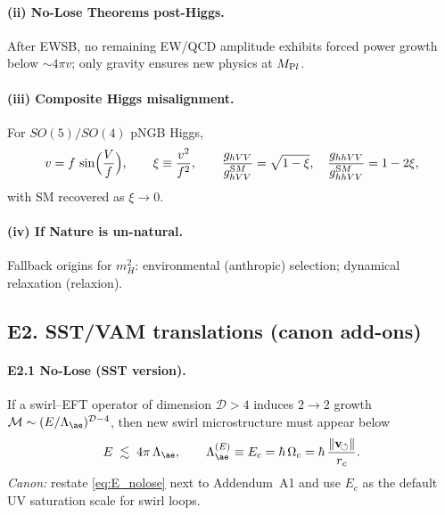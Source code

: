 \documentclass[11pt]{article}
\begin{document}
          \paragraph{(ii) No-Lose Theorems post-Higgs.}
              After EWSB, no remaining EW/QCD amplitude exhibits forced power growth below $\sim 4\pi v$; only gravity ensures new physics at $M_{\textrm Pl}$.

          \paragraph{(iii) Composite Higgs misalignment.}
              For $SO(5)/SO(4)$ pNGB Higgs,
              \begin{equation}\label{eq:E_pNGB}
          v=f\,\sin\!\Big(\frac{V}{f}\Big),\qquad \xi\equiv\frac{v^2}{f^2},
          \qquad
          \frac{g_{hVV}}{g_{hVV}^{\textrm SM}}=\sqrt{1-\xi},\quad
          \frac{g_{hhVV}}{g_{hhVV}^{\textrm SM}}=1-2\xi,
              \end{equation}
              with SM recovered as $\xi\to0$.

          \paragraph{(iv) If Nature is un-natural.}
              Fallback origins for $m_H^2$: environmental (anthropic) selection; dynamical relaxation (relaxion).

  \subsection*{E2. SST/VAM translations (canon add-ons)}
      \paragraph{E2.1 No-Lose (SST version).}
          If a swirl–EFT operator of dimension $\mathcal D>4$ induces $2\!\to\!2$ growth
          $\mathcal M\sim (E/\Lambda_{\ae})^{\mathcal D-4}$, then new swirl microstructure must appear below
          \begin{equation}\label{eq:E_nolose}
          E \;\lesssim\; 4\pi\,\Lambda_{\ae},
          \qquad
          \Lambda_{\ae}^{(E)}\equiv E_c=\hbar\,\Omega_c=\hbar\,\frac{\|{\bf v}_{\!\circlearrowleft}\|}{r_c}.
          \end{equation}
          \emph{Canon:} restate \eqref{eq:E_nolose} next to Addendum~A1 and use $E_c$ as the default UV saturation scale for swirl loops.
\end{document}
